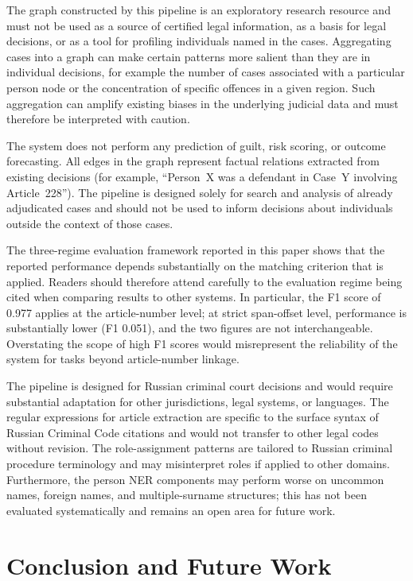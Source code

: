 \documentclass[11pt]{article}
\begin{document}
The graph constructed by this pipeline is an exploratory research resource and must not be used as a source of certified legal information, as a basis for legal decisions, or as a tool for profiling individuals named in the cases. Aggregating cases into a graph can make certain patterns more salient than they are in individual decisions, for example the number of cases associated with a particular person node or the concentration of specific offences in a given region. Such aggregation can amplify existing biases in the underlying judicial data and must therefore be interpreted with caution.

The system does not perform any prediction of guilt, risk scoring, or outcome forecasting. All edges in the graph represent factual relations extracted from existing decisions (for example, ``Person~X was a defendant in Case~Y involving Article~228''). The pipeline is designed solely for search and analysis of already adjudicated cases and should not be used to inform decisions about individuals outside the context of those cases.

The three-regime evaluation framework reported in this paper shows that the reported performance depends substantially on the matching criterion that is applied. Readers should therefore attend carefully to the evaluation regime being cited when comparing results to other systems. In particular, the F1 score of 0.977 applies at the article-number level; at strict span-offset level, performance is substantially lower (F1 0.051), and the two figures are not interchangeable. Overstating the scope of high F1 scores would misrepresent the reliability of the system for tasks beyond article-number linkage.

The pipeline is designed for Russian criminal court decisions and would require substantial adaptation for other jurisdictions, legal systems, or languages. The regular expressions for article extraction are specific to the surface syntax of Russian Criminal Code citations and would not transfer to other legal codes without revision. The role-assignment patterns are tailored to Russian criminal procedure terminology and may misinterpret roles if applied to other domains. Furthermore, the person NER components may perform worse on uncommon names, foreign names, and multiple-surname structures; this has not been evaluated systematically and remains an open area for future work.

\section{Conclusion and Future Work}
\end{document}
